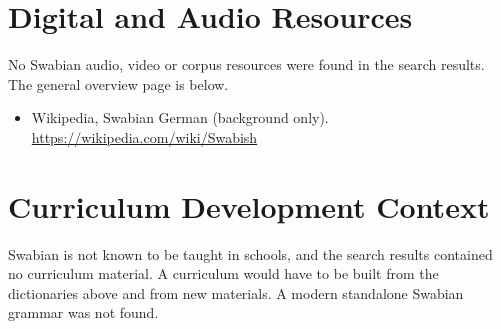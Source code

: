 \documentclass[12pt]{article}
\begin{document}
\section{Digital and Audio Resources}
No Swabian audio, video or corpus resources were found in the search results. The general overview page is below.
\begin{itemize}
\item Wikipedia, Swabian German (background only). \url{https://wikipedia.com/wiki/Swabish}
\end{itemize}

\section{Curriculum Development Context}
Swabian is not known to be taught in schools, and the search results contained no curriculum material. A curriculum would have to be built from the dictionaries above and from new materials. A modern standalone Swabian grammar was not found.
\end{document}
